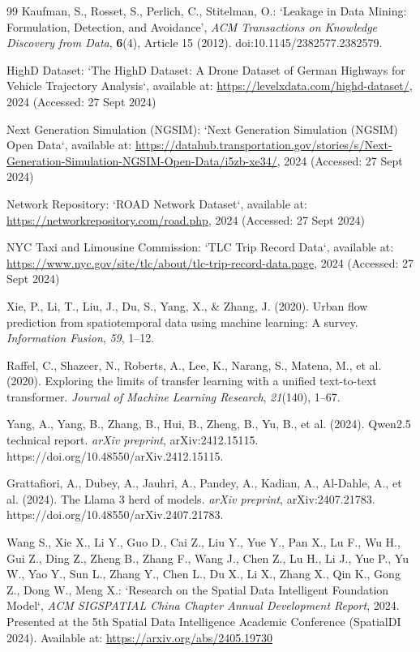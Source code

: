 \documentclass[a4paper,fleqn]{cas-sc}
\begin{document}
\begin{thebibliography}{99}
Kaufman, S., Rosset, S., Perlich, C., Stitelman, O.:
`Leakage in Data Mining: Formulation, Detection, and Avoidance',
\textit{ACM Transactions on Knowledge Discovery from Data},
\textbf{6}(4), Article 15 (2012).
doi:10.1145/2382577.2382579.

HighD Dataset:  
`The HighD Dataset: A Drone Dataset of German Highways for Vehicle Trajectory Analysis`, available at: \url{https://levelxdata.com/highd-dataset/}, 2024 (Accessed: 27 Sept 2024)

Next Generation Simulation (NGSIM):  
`Next Generation Simulation (NGSIM) Open Data`, available at: \url{https://datahub.transportation.gov/stories/s/Next-Generation-Simulation-NGSIM-Open-Data/i5zb-xe34/}, 2024 (Accessed: 27 Sept 2024)

Network Repository:  
`ROAD Network Dataset`, available at: \url{https://networkrepository.com/road.php}, 2024 (Accessed: 27 Sept 2024)

NYC Taxi and Limousine Commission:  
`TLC Trip Record Data`, available at: \url{https://www.nyc.gov/site/tlc/about/tlc-trip-record-data.page}, 2024 (Accessed: 27 Sept 2024)

Xie, P., Li, T., Liu, J., Du, S., Yang, X., \& Zhang, J. (2020).
Urban flow prediction from spatiotemporal data using machine learning:
A survey.
\textit{Information Fusion}, \textit{59}, 1--12.

Raffel, C., Shazeer, N., Roberts, A., Lee, K., Narang, S.,
Matena, M., et al. (2020).
Exploring the limits of transfer learning with a unified
text-to-text transformer.
\textit{Journal of Machine Learning Research},
\textit{21}(140), 1--67.

Yang, A., Yang, B., Zhang, B., Hui, B., Zheng, B.,
Yu, B., et al. (2024).
Qwen2.5 technical report.
\textit{arXiv preprint}, arXiv:2412.15115.
https://doi.org/10.48550/arXiv.2412.15115.

Grattafiori, A., Dubey, A., Jauhri, A., Pandey, A.,
Kadian, A., Al-Dahle, A., et al. (2024).
The Llama 3 herd of models.
\textit{arXiv preprint}, arXiv:2407.21783.
https://doi.org/10.48550/arXiv.2407.21783.

Wang S., Xie X., Li Y., Guo D., Cai Z., Liu Y., Yue Y., Pan X., Lu F., Wu H., Gui Z., Ding Z., Zheng B., Zhang F., Wang J., Chen Z., Lu H., Li J., Yue P., Yu W., Yao Y., Sun L., Zhang Y., Chen L., Du X., Li X., Zhang X., Qin K., Gong Z., Dong W., Meng X.:  
`Research on the Spatial Data Intelligent Foundation Model`, \textit{ACM SIGSPATIAL China Chapter Annual Development Report}, 2024. Presented at the 5th Spatial Data Intelligence Academic Conference (SpatialDI 2024). Available at: \url{https://arxiv.org/abs/2405.19730}


\end{thebibliography}
\end{document}
